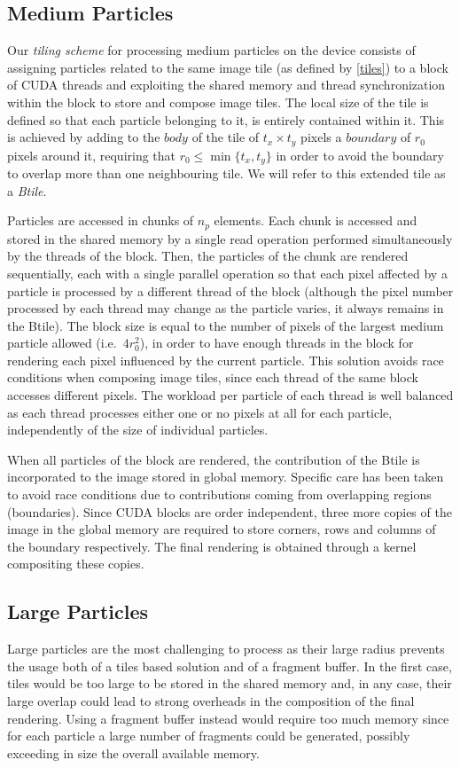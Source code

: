\documentclass[preprint,5pt]{elsarticle}
\begin{document}
\subsection{Medium Particles}
\label{sec:mediumparticles}
Our \textit{tiling scheme} for processing medium particles on the device consists of assigning particles related to the same image tile (as defined by \eqref{tiles}) to a block of CUDA threads and exploiting the shared memory and thread synchronization within the block to store and compose image tiles. The local size of the tile is defined so that each particle belonging to it, is entirely contained within it. This is achieved by adding to the $body$ of the tile of $t_x \times t_y$ pixels a $boundary$ of $r_0$ pixels around it, requiring that $r_0 \le \min\{t_x, t_y\}$ in order to avoid the boundary to overlap more than one neighbouring tile. We will refer to this extended tile as a \textit{Btile}.

Particles are accessed in chunks of $n_p$ elements. Each chunk is accessed and stored in the shared memory by a single read operation performed simultaneously by the threads of the block. Then, the particles of the chunk are rendered sequentially, each with a single parallel operation so that each pixel affected by a particle is processed by a different thread of the block (although the pixel number processed by each thread may change as the particle varies, it always remains in the Btile). The block size is equal to the number of pixels of the largest medium particle allowed (i.e.~$4r_0^2$), in order to have enough threads in the block for rendering each pixel influenced by the current particle. 
This solution avoids race conditions when composing image tiles, since each
thread of the same block accesses different pixels. The workload per particle of each
thread is well balanced as each thread processes either one or no pixels at all for each particle, independently of the size of individual particles.

When all particles of the block are rendered, the contribution of the Btile is incorporated to the image stored in global memory. Specific care has been taken to avoid race conditions due to contributions coming
from overlapping regions (boundaries). Since CUDA blocks are order independent, three more copies of the image in the global memory are required to store corners, rows and columns of the boundary respectively. The final rendering is obtained through a kernel compositing these copies.  

\subsection{Large Particles}
\label{sec:largeparticles}
Large particles are the most challenging to process as their large
radius prevents the usage both of a tiles based solution and of a fragment buffer.
In the first case, tiles would be too large to be stored in the shared memory
and, in any case, their large overlap could lead to strong overheads in the composition of the
final rendering. Using a fragment buffer instead would require too much memory since
for each particle a large number of fragments could be generated, possibly
exceeding in size the overall available memory.
\end{document}
